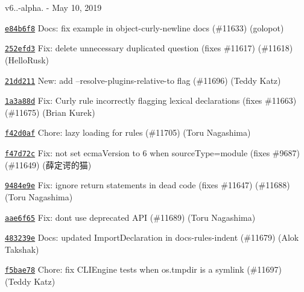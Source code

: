v6..-\/alpha. -\/ May 10, 2019


\begin{DoxyItemize}
\item \href{https://github.com/eslint/eslint/commit/e84b6f8b171ba4266164688f76d5ee45d278e5c2}{\texttt{ {\ttfamily e84b6f8}}} Docs\+: fix example in object-\/curly-\/newline docs (\#11633) (golopot)
\item \href{https://github.com/eslint/eslint/commit/252efd337b1441debb6d2cc8f51a625549b2c535}{\texttt{ {\ttfamily 252efd3}}} Fix\+: delete unnecessary duplicated question (fixes \#11617) (\#11618) (Hello\+Rusk)
\item \href{https://github.com/eslint/eslint/commit/21dd2116c70b93aa8dd50d2b15e202724b11486a}{\texttt{ {\ttfamily 21dd211}}} New\+: add --resolve-\/plugins-\/relative-\/to flag (\#11696) (Teddy Katz)
\item \href{https://github.com/eslint/eslint/commit/1a3a88df2f952c34631d8e1d83de47178826fce0}{\texttt{ {\ttfamily 1a3a88d}}} Fix\+: Curly rule incorrectly flagging lexical declarations (fixes \#11663) (\#11675) (Brian Kurek)
\item \href{https://github.com/eslint/eslint/commit/f42d0afd89874b459fce1eb1998247d53f9aa42b}{\texttt{ {\ttfamily f42d0af}}} Chore\+: lazy loading for rules (\#11705) (Toru Nagashima)
\item \href{https://github.com/eslint/eslint/commit/f47d72ce2f2edb80cd38810894b9d4bda896bb29}{\texttt{ {\ttfamily f47d72c}}} Fix\+: not set ecma\+Version to 6 when source\+Type=module (fixes \#9687) (\#11649) (薛定谔的猫)
\item \href{https://github.com/eslint/eslint/commit/9484e9ea188ff70683c3112e397c7fddcc3f8095}{\texttt{ {\ttfamily 9484e9e}}} Fix\+: ignore return statements in dead code (fixes \#11647) (\#11688) (Toru Nagashima)
\item \href{https://github.com/eslint/eslint/commit/aae6f6525557ba06e73f051511646056313fcf91}{\texttt{ {\ttfamily aae6f65}}} Fix\+: don\textquotesingle{}t use deprecated API (\#11689) (Toru Nagashima)
\item \href{https://github.com/eslint/eslint/commit/483239ec74a0c13529fc99547a784b749f41dd54}{\texttt{ {\ttfamily 483239e}}} Docs\+: updated Import\+Declaration in docs-\/rules-\/indent (\#11679) (Alok Takshak)
\item \href{https://github.com/eslint/eslint/commit/f5bae78c19d5359f67969a2ff344025082e253f4}{\texttt{ {\ttfamily f5bae78}}} Chore\+: fix CLIEngine tests when os.\+tmpdir is a symlink (\#11697) (Teddy Katz)

\end{DoxyItemize}
